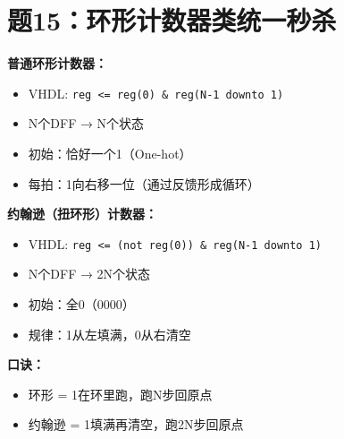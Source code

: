 \section{题15：环形计数器类统一秒杀}

\begin{quickkill}[环形计数器秒杀总结]
\textbf{普通环形计数器：}
\begin{itemize}
  \item VHDL: \texttt{reg <= reg(0) \& reg(N-1 downto 1)}
  \item N个DFF → N个状态
  \item 初始：恰好一个1（One-hot）
  \item 每拍：1向右移一位（通过反馈形成循环）
\end{itemize}

\textbf{约翰逊（扭环形）计数器：}
\begin{itemize}
  \item VHDL: \texttt{reg <= (not reg(0)) \& reg(N-1 downto 1)}
  \item N个DFF → 2N个状态
  \item 初始：全0（0000）
  \item 规律：1从左填满，0从右清空
\end{itemize}

\textbf{口诀：}
\begin{itemize}
  \item 环形 = 1在环里跑，跑N步回原点
  \item 约翰逊 = 1填满再清空，跑2N步回原点
\end{itemize}
\end{quickkill}
